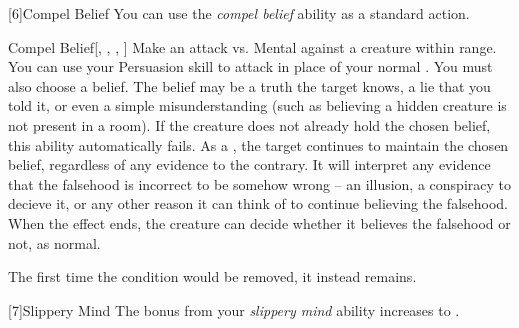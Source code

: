         [6]{Compel Belief} You can use the \textit{compel belief} ability as a standard action.
        \begin{freeability}{Compel Belief}[, , , ]
            Make an attack vs. Mental against a creature within \rngmed range.
            You can use your Persuasion skill to attack in place of your normal .
            You must also choose a belief.
            The belief may be a truth the target knows, a lie that you told it, or even a simple misunderstanding (such as believing a hidden creature is not present in a room).
            If the creature does not already hold the chosen belief, this ability automatically fails.
            \hit As a , the target continues to maintain the chosen belief, regardless of any evidence to the contrary.
            It will interpret any evidence that the falsehood is incorrect to be somehow wrong -- an illusion, a conspiracy to decieve it, or any other reason it can think of to continue believing the falsehood.
            When the effect ends, the creature can decide whether it believes the falsehood or not, as normal.

            \rankline
             The first time the condition would be removed, it instead remains.
        \end{freeability}

        [7]{Slippery Mind} The bonus from your \textit{slippery mind} ability increases to .

\newpage
